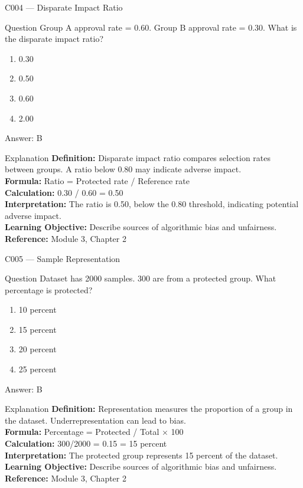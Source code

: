 \documentclass[aspectratio=169,8pt]{beamer}
\begin{document}
	\begin{frame}{C004 --- Disparate Impact Ratio}
		\begin{block}{Question}
			Group A approval rate = 0.60. Group B approval rate = 0.30. What is the disparate impact ratio?
			\begin{enumerate}
				\item 0.30
				\item 0.50
				\item 0.60
				\item 2.00
			\end{enumerate}
		\end{block}
		\begin{exampleblock}{Answer: B}\end{exampleblock}
		\begin{block}{Explanation}
			\textbf{Definition:} Disparate impact ratio compares selection rates between groups. A ratio below 0.80 may indicate adverse impact.\\
			\textbf{Formula:} Ratio = Protected rate / Reference rate\\
			\textbf{Calculation:} 0.30 / 0.60 = 0.50\\
			\textbf{Interpretation:} The ratio is 0.50, below the 0.80 threshold, indicating potential adverse impact.\\
			\textbf{Learning Objective:} Describe sources of algorithmic bias and unfairness.\\
			\textbf{Reference:} Module 3, Chapter 2
		\end{block}
	\end{frame}
	
	\begin{frame}{C005 --- Sample Representation}
		\begin{block}{Question}
			Dataset has 2000 samples. 300 are from a protected group. What percentage is protected?
			\begin{enumerate}
				\item 10 percent
				\item 15 percent
				\item 20 percent
				\item 25 percent
			\end{enumerate}
		\end{block}
		\begin{exampleblock}{Answer: B}\end{exampleblock}
		\begin{block}{Explanation}
			\textbf{Definition:} Representation measures the proportion of a group in the dataset. Underrepresentation can lead to bias.\\
			\textbf{Formula:} Percentage = Protected / Total $\times$ 100\\
			\textbf{Calculation:} 300/2000 = 0.15 = 15 percent\\
			\textbf{Interpretation:} The protected group represents 15 percent of the dataset.\\
			\textbf{Learning Objective:} Describe sources of algorithmic bias and unfairness.\\
			\textbf{Reference:} Module 3, Chapter 2
		\end{block}
	\end{frame}
	
\end{document}
